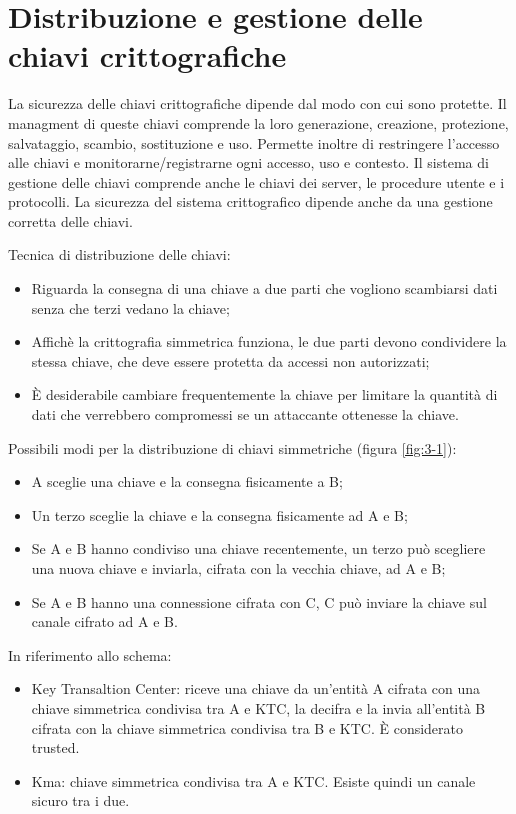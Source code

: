 \setchapterpreamble[u]{\margintoc}
\chapter{Distribuzione e gestione delle chiavi crittografiche}

La sicurezza delle chiavi crittografiche dipende dal modo con cui sono protette. Il managment di queste chiavi comprende la loro generazione, creazione, protezione, salvataggio, scambio, sostituzione e uso. Permette inoltre di restringere l'accesso alle chiavi e monitorarne/registrarne ogni accesso, uso e contesto.
Il sistema di gestione delle chiavi comprende anche le chiavi dei server, le procedure utente e i protocolli.
La sicurezza del sistema crittografico dipende anche da una gestione corretta delle chiavi.

Tecnica di distribuzione delle chiavi: 
\begin{itemize}
    \item Riguarda la consegna di una chiave a due parti che vogliono scambiarsi dati senza che terzi vedano la chiave;
	\item Affichè la crittografia simmetrica funziona, le due parti devono condividere la stessa chiave, che deve essere protetta da accessi non autorizzati;
	\item È desiderabile cambiare frequentemente la chiave per limitare la quantità di dati che verrebbero compromessi se un attaccante ottenesse la chiave.
\end{itemize}

Possibili modi per la distribuzione di chiavi simmetriche (figura \ref{fig:3-1}):
\begin{itemize}
    \item A sceglie una chiave e la consegna fisicamente a B;
	\item Un terzo sceglie la chiave e la consegna fisicamente ad A e B;
	\item Se A e B hanno condiviso una chiave recentemente, un terzo può scegliere una nuova chiave e inviarla, cifrata con la vecchia chiave, ad A e B;
    \item Se A e B hanno una connessione cifrata con C, C può inviare la chiave sul canale cifrato ad A e B.
\end{itemize}

In riferimento allo schema:
\begin{itemize}
    \item Key Transaltion Center: riceve una chiave da un'entità A cifrata con una chiave simmetrica condivisa tra A e KTC, la decifra e la invia all'entità B cifrata con la chiave simmetrica condivisa tra B e KTC. È considerato trusted.
    \item Kma: chiave simmetrica condivisa tra A e KTC. Esiste quindi un canale sicuro tra i due.
\end{itemize}


